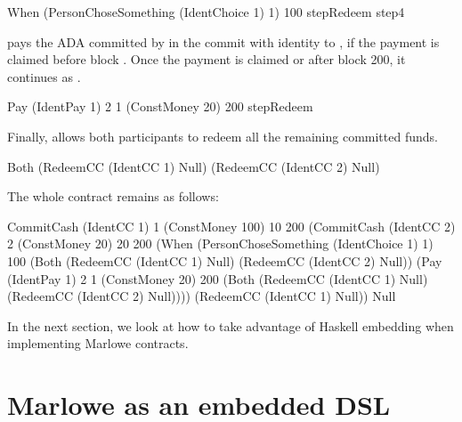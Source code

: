 \documentclass[runningheads]{llncs}
\begin{document}
{\begin{haskellcode}
When (PersonChoseSomething (IdentChoice 1) 1) 100
     stepRedeem
     step4
\end{haskellcode}

 pays the  ADA committed by  in the commit with 
identity  to , if the payment is claimed before block 
. Once the payment is claimed or after block 200, it continues as .

\begin{haskellcode}
Pay (IdentPay 1) 2 1 (ConstMoney 20) 200 stepRedeem
\end{haskellcode}

Finally,  allows both participants to redeem all the remaining committed funds.

\begin{haskellcode}
Both (RedeemCC (IdentCC 1) Null)
     (RedeemCC (IdentCC 2) Null)
\end{haskellcode}

The whole contract remains as follows:
\begin{haskellcode}
CommitCash (IdentCC 1) 1
           (ConstMoney 100)
           10 200
           (CommitCash (IdentCC 2) 2
                       (ConstMoney 20)
                       20 200
                       (When (PersonChoseSomething (IdentChoice 1) 1)
                             100
                             (Both (RedeemCC (IdentCC 1) Null)
                                   (RedeemCC (IdentCC 2) Null))
                             (Pay (IdentPay 1) 2 1
                                  (ConstMoney 20)
                                  200
                                  (Both (RedeemCC (IdentCC 1) Null)
                                        (RedeemCC (IdentCC 2) Null))))
                       (RedeemCC (IdentCC 1) Null))
           Null
\end{haskellcode}

In the next section, we look at how to take advantage of Haskell embedding when implementing Marlowe contracts.


} %

\section{Marlowe as an embedded DSL}
\label{section:example-escrow}
\end{document}
